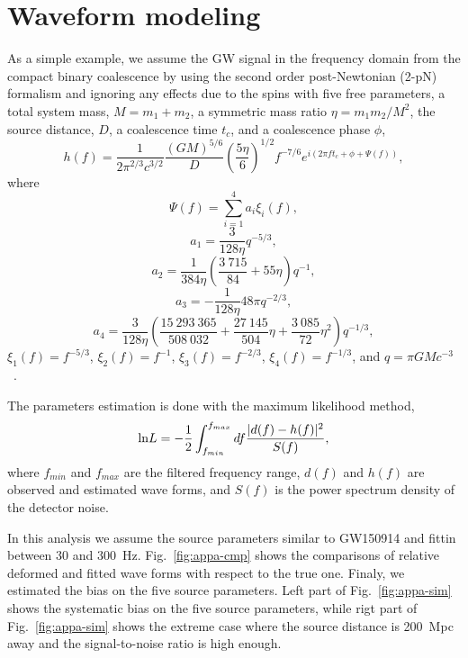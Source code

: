 \section{Waveform modeling}
As a simple example, we assume the GW signal in the frequency domain from 
the compact binary coalescence by using the second order post-Newtonian (2-pN) 
formalism and ignoring any effects due to the spins with five free parameters, 
a total system mass, $M=m_1+m_2$,
a symmetric mass ratio $\eta=m_1 m_2/M^2$, the source distance, $D$, 
a coalescence time $t_c$, and a coalescence phase $\phi$,
\begin{equation}
h(f) = \frac{1}{2\pi^{2/3}c^{3/2}}\frac{(GM)^{5/6}}{D}\left(\frac{5\eta}{6}\right)^{1/2}f^{-7/6} e^{i(2\pi ft_c+\phi+\Psi(f))},
\end{equation}
where 
\begin{equation}
\Psi(f)=\sum_{i=1}^4 a_i \xi_i(f),
\end{equation}
\begin{equation}
a_1=\frac{3}{128\eta}q^{-5/3},
\end{equation}
\begin{equation}
a_2=\frac{1}{384\eta}\left(\frac{3\:715}{84}+55\eta\right)q^{-1},
\end{equation}
\begin{equation}
a_3=-\frac{1}{128\eta}48\pi q^{-2/3},
\end{equation}
\begin{equation}
a_4=\frac{3}{128\eta}\left(\frac{15\:293\:365}{508\:032}+
\frac{27\:145}{504}\eta+\frac{3\:085}{72}\eta^2\right)q^{-1/3},
\end{equation}
$\xi_1(f)=f^{-5/3}$, $\xi_2(f)=f^{-1}$, $\xi_3(f)=f^{-2/3}$, 
$\xi_4(f)=f^{-1/3}$, and $q=\pi GMc^{-3}$~\cite{Tanaka-Tagoshi}.

The parameters estimation is done with the maximum likelihood method, 
\begin{equation}
{\rm ln}L = -\frac{1}{2}\int_{f_{min}}^{f_{max}}df\frac{|d(f)-h(f)|^{2}}{S(f)},
\end{equation}
where $f_{min}$ and $f_{max}$ are the filtered frequency range, 
$d(f)$ and $h(f)$ are observed and estimated wave forms, and 
$S(f)$ is the power spectrum density of the detector noise.

In this analysis we assume the source parameters similar to GW150914 
and fittin between 30 and 300~Hz.
Fig.~\ref{fig:appa-cmp} shows the comparisons of relative deformed and fitted 
wave forms with respect to the true one. Finaly, we estimated the bias on 
the five source parameters. Left part of Fig.~\ref{fig:appa-sim} shows 
the systematic bias on the five source parameters, while rigt part of 
Fig.~\ref{fig:appa-sim} shows the extreme case where the source distance is 
200~Mpc away and the signal-to-noise ratio is high enough.

